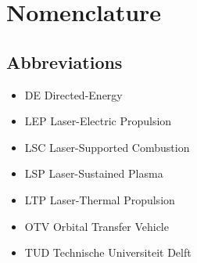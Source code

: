\chapter*{Nomenclature}
\setlength{\columnsep}{1cm}
\newenvironment{nomtable}
    {
        \centering
        \tabularx{\columnwidth}{r>{\raggedright\arraybackslash}X}
    }
    {
        \endtabularx
    }
\newenvironment{nomlist}
    {
        \begin{itemize}[leftmargin=1.5cm]
            \raggedright
            \setlength{\parsep}{0pt}
            \setlength{\itemsep}{-4pt}
    }
    {
        \end{itemize}
    }
\begin{multicols*}{2}
    \section*{Abbreviations}

    \begin{nomlist}
        \item[DE    ] Directed-Energy 
        \item[LEP   ] Laser-Electric Propulsion
        \item[LSC   ] Laser-Supported Combustion
        \item[LSP   ] Laser-Sustained Plasma
        \item[LTP   ] Laser-Thermal Propulsion
        \item[OTV]  Orbital Transfer Vehicle 
        \item[TUD   ] Technische Universiteit Delft
    \end{nomlist}


\end{multicols*}

